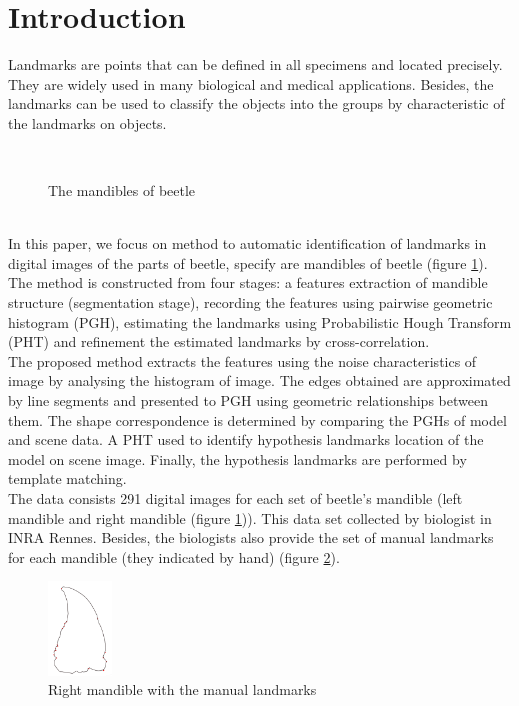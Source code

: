 \documentclass[11pt, twocolumn, a4paper]{article}
\begin{document}
\section{Introduction}
Landmarks are points that can be defined in all specimens and located precisely. They are widely used in many biological and medical applications. Besides, the landmarks can be used to classify the objects into the groups by characteristic of the landmarks on objects. 
\begin{figure}[h!]
\centering
{}~~
\caption{The mandibles of beetle}
\label{fig:figure_11}
\end{figure}~\\
In this paper, we focus on method to automatic identification of landmarks in digital images of the parts of beetle, specify are mandibles of beetle (figure \ref{fig:figure_11}). The method is constructed from four stages: a features extraction of mandible structure (segmentation stage), recording the features using pairwise geometric histogram (PGH), estimating the landmarks using Probabilistic Hough Transform (PHT) and refinement the estimated landmarks by cross-correlation.\\[0.3cm]
The proposed method extracts the features using the noise characteristics of image by analysing the histogram of image. The edges obtained are approximated by line segments and presented to PGH using geometric relationships between them. The shape correspondence is determined by comparing the PGHs of model and scene data. A PHT used to identify hypothesis landmarks location of the model on scene image. Finally, the hypothesis landmarks are performed by template matching.\\[0.3cm]
The data consists 291 digital images for each set of beetle's mandible (left mandible and right mandible (figure \ref{fig:figure_11})). This data set collected by biologist in INRA Rennes. Besides, the biologists also provide the set of manual landmarks for each mandible (they indicated by hand) (figure \ref{lm_example}).
\begin{figure}[h!]
\centering
\includegraphics[width=0.15\textwidth]{./images/rshape}
\caption{Right mandible with the manual landmarks}
\label{lm_example}
\end{figure}
\end{document}
